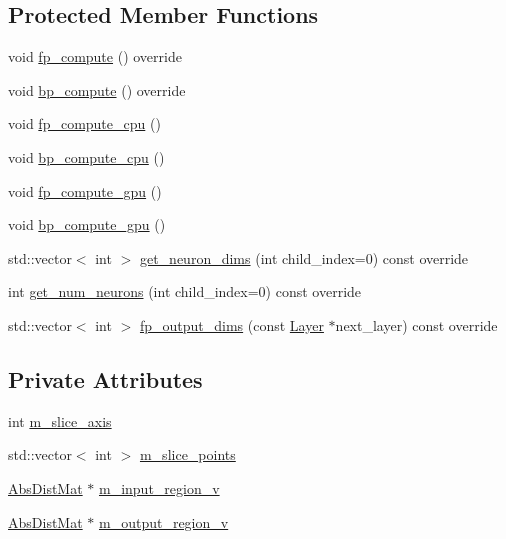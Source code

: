 \subsection*{Protected Member Functions}
\begin{DoxyCompactItemize}
\item 
void \hyperlink{classlbann_1_1slice__layer_a4ade139cc44a7de47761680e1d44cb08}{fp\+\_\+compute} () override
\item 
void \hyperlink{classlbann_1_1slice__layer_a080654076a1b266b2c6d229e9fccf250}{bp\+\_\+compute} () override
\item 
void \hyperlink{classlbann_1_1slice__layer_ab4c95d24916534cdff58b32916171ff2}{fp\+\_\+compute\+\_\+cpu} ()
\item 
void \hyperlink{classlbann_1_1slice__layer_af5d6887cac9a0c3afab8f361cdf81034}{bp\+\_\+compute\+\_\+cpu} ()
\item 
void \hyperlink{classlbann_1_1slice__layer_a875347929b9e4c0a70749da0dbb6469e}{fp\+\_\+compute\+\_\+gpu} ()
\item 
void \hyperlink{classlbann_1_1slice__layer_a798c10e5c19f58e38da9d2d50c49ca3e}{bp\+\_\+compute\+\_\+gpu} ()
\item 
std\+::vector$<$ int $>$ \hyperlink{classlbann_1_1slice__layer_a824178abe2450bd331304ab0d50214ce}{get\+\_\+neuron\+\_\+dims} (int child\+\_\+index=0) const override
\item 
int \hyperlink{classlbann_1_1slice__layer_ab36016849a59dfa23d37fd0cd2ec943c}{get\+\_\+num\+\_\+neurons} (int child\+\_\+index=0) const override
\item 
std\+::vector$<$ int $>$ \hyperlink{classlbann_1_1slice__layer_a086c918fe72f28248f987d6a3aef355d}{fp\+\_\+output\+\_\+dims} (const \hyperlink{classlbann_1_1Layer}{Layer} $\ast$next\+\_\+layer) const override
\end{DoxyCompactItemize}
\subsection*{Private Attributes}
\begin{DoxyCompactItemize}
\item 
int \hyperlink{classlbann_1_1slice__layer_a349dcd71f67d77d40247da24e4641ea2}{m\+\_\+slice\+\_\+axis}
\item 
std\+::vector$<$ int $>$ \hyperlink{classlbann_1_1slice__layer_af79dab13a70da2e81209e7ae15166e30}{m\+\_\+slice\+\_\+points}
\item 
\hyperlink{base_8hpp_a9a697a504ae84010e7439ffec862b470}{Abs\+Dist\+Mat} $\ast$ \hyperlink{classlbann_1_1slice__layer_a3e64f86a9e999d3d72867c6009aa99ba}{m\+\_\+input\+\_\+region\+\_\+v}
\item 
\hyperlink{base_8hpp_a9a697a504ae84010e7439ffec862b470}{Abs\+Dist\+Mat} $\ast$ \hyperlink{classlbann_1_1slice__layer_a9d72208fc8136641e91cb208c38f8b65}{m\+\_\+output\+\_\+region\+\_\+v}
\end{DoxyCompactItemize}
